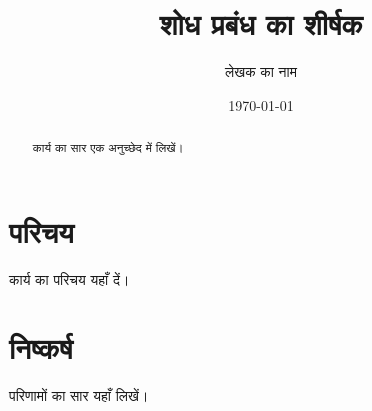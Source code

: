 \documentclass[12pt]{report}
\title{शोध प्रबंध का शीर्षक}
\author{लेखक का नाम}
\date{\today}
\begin{document}
\maketitle

\begin{abstract}
कार्य का सार एक अनुच्छेद में लिखें।
\end{abstract}

\tableofcontents

\chapter{परिचय}
कार्य का परिचय यहाँ दें।

\chapter{निष्कर्ष}
परिणामों का सार यहाँ लिखें।
\end{document}
